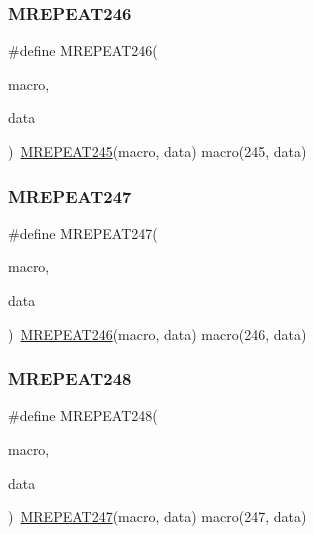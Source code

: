\mbox{\label{group__group__sam0__utils__mrepeat_ga648b2d33e6ae37d7f576055603bcb620}} 
\subsubsection{\texorpdfstring{MREPEAT246}{MREPEAT246}}
{\footnotesize\ttfamily \#define M\+R\+E\+P\+E\+A\+T246(\begin{DoxyParamCaption}\item[{}]{macro,  }\item[{}]{data }\end{DoxyParamCaption})~\mbox{\hyperlink{group__group__sam0__utils__mrepeat_gaef88abd24a21c1424bcef16151f33acc}{M\+R\+E\+P\+E\+A\+T245}}(macro, data)   macro(245, data)}

\mbox{\label{group__group__sam0__utils__mrepeat_ga93c99f19dd27b6ad1c3921e4f473f50d}} 
\subsubsection{\texorpdfstring{MREPEAT247}{MREPEAT247}}
{\footnotesize\ttfamily \#define M\+R\+E\+P\+E\+A\+T247(\begin{DoxyParamCaption}\item[{}]{macro,  }\item[{}]{data }\end{DoxyParamCaption})~\mbox{\hyperlink{group__group__sam0__utils__mrepeat_ga648b2d33e6ae37d7f576055603bcb620}{M\+R\+E\+P\+E\+A\+T246}}(macro, data)   macro(246, data)}

\mbox{\label{group__group__sam0__utils__mrepeat_ga0bee84ef9cc1bc4f81563c8fc476fed4}} 
\subsubsection{\texorpdfstring{MREPEAT248}{MREPEAT248}}
{\footnotesize\ttfamily \#define M\+R\+E\+P\+E\+A\+T248(\begin{DoxyParamCaption}\item[{}]{macro,  }\item[{}]{data }\end{DoxyParamCaption})~\mbox{\hyperlink{group__group__sam0__utils__mrepeat_ga93c99f19dd27b6ad1c3921e4f473f50d}{M\+R\+E\+P\+E\+A\+T247}}(macro, data)   macro(247, data)}

